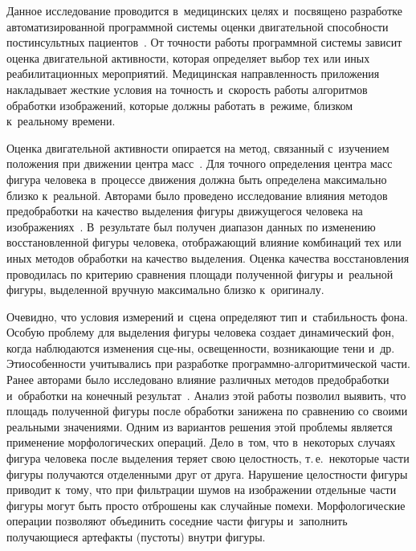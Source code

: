 \begin{multicols}{2}
  Данное исследование проводится в~медицинских целях и~посвящено
разработке автоматизированной программной системы оценки двигательной
способности постинсультных пациентов~\cite{7-ab, 8-ab}. От точности работы
программной системы зависит оценка двигательной активности, которая
определяет выбор тех или иных реабилитационных мероприятий. Медицинская
направленность приложения накладывает жесткие условия на точность и~скорость работы алгоритмов обработки изображений, которые должны
работать в~режиме, близком к~реальному времени.

  Оценка двигательной активности опирается на метод, связанный с~изучением
положения при движении центра масс~\cite{8-ab}. Для точного определения
центра масс фигура человека в~процессе движения должна быть определена
максимально близко к~реальной. Авторами было проведено исследование
влияния методов предобработки на качество выделения фигуры движущегося
человека на изображениях~\cite{9-ab}. В~результате был получен диапазон
данных по изменению восстановленной фигуры человека, отображающий
влияние комбинаций тех или иных методов обработки на качество выделения.
Оценка качества восстановления проводилась по критерию сравнения площади
полученной фигуры и~реальной фигуры, выделенной вручную максимально
близко к~оригиналу.

  Очевидно, что условия измерений и~сцена определяют тип и~стабильность
фона. Особую проблему для выделения фигуры человека создает динамический
фон, когда наблюдаются изменения сце-\linebreak ны, освещенности, возникающие тени и~др. 
Эти\linebreak особенности учитывались при разработке про\-граммно-ал\-го\-рит\-ми\-че\-ской части. Ранее авторами было исследовано влияние различных
методов пред\-об\-ра\-бот\-ки и~обработки на конечный результат~\cite{9-ab}. Анализ
этой работы позволил выявить, что площадь полученной фигуры после
обработки занижена по сравнению со своими реальными значениями. Одним из
вариантов решения этой проб\-ле\-мы является применение морфологических
операций. Дело в~том, что в~некоторых случаях фигура человека после
выделения теряет свою целостность, т.\,е.\ некоторые части фигуры получаются
отделенными друг от друга. Нарушение це\-лост\-ности фигуры приводит к~тому,
что при фильтрации шумов на изображении отдельные части фигуры могут
быть просто отброшены как случайные помехи. Морфологические операции
позволяют объединить соседние части фигуры и~заполнить получающиеся
артефакты (пус\-то\-ты) внутри фигуры.


\end{multicols}
